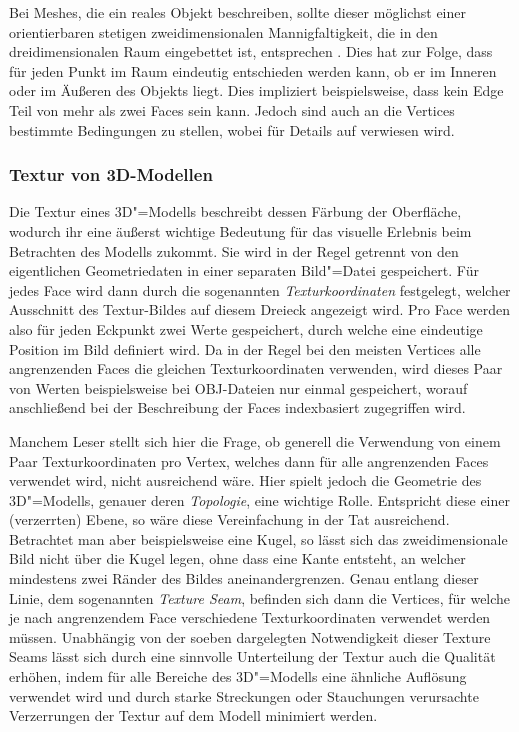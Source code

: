 Bei Meshes, die ein reales Objekt beschreiben, sollte dieser möglichst einer orientierbaren stetigen zweidimensionalen Mannigfaltigkeit, die in den dreidimensionalen Raum eingebettet ist, entsprechen \cite[S.~3]{botsch2010}. Dies hat zur Folge, dass für jeden Punkt im Raum eindeutig entschieden werden kann, ob er im Inneren oder im Äußeren des Objekts liegt. Dies impliziert beispielsweise, dass kein Edge Teil von mehr als zwei Faces sein kann. Jedoch sind auch an die Vertices bestimmte Bedingungen zu stellen, wobei für Details auf \cite[S.~11f]{botsch2010} verwiesen wird.

\subsubsection{Textur von 3D-Modellen}

Die Textur eines 3D"=Modells beschreibt dessen Färbung der Oberfläche, wodurch ihr eine äußerst wichtige Bedeutung für das visuelle Erlebnis beim Betrachten des Modells zukommt. Sie wird in der Regel getrennt von den eigentlichen Geometriedaten in einer separaten Bild"=Datei gespeichert. Für jedes Face wird dann durch die sogenannten \emph{Texturkoordinaten} festgelegt, welcher Ausschnitt des Textur-Bildes auf diesem Dreieck angezeigt wird. Pro Face werden also für jeden Eckpunkt zwei Werte gespeichert, durch welche eine eindeutige Position im Bild definiert wird. Da in der Regel bei den meisten Vertices alle angrenzenden Faces die gleichen Texturkoordinaten verwenden, wird dieses Paar von Werten beispielsweise bei OBJ-Dateien nur einmal gespeichert, worauf anschließend bei der Beschreibung der Faces indexbasiert zugegriffen wird.

Manchem Leser stellt sich hier die Frage, ob generell die Verwendung von einem Paar Texturkoordinaten pro Vertex, welches dann für alle angrenzenden Faces verwendet wird, nicht ausreichend wäre. Hier spielt jedoch die Geometrie des 3D"=Modells, genauer deren \emph{Topologie}, eine wichtige Rolle. Entspricht diese einer (verzerrten) Ebene, so wäre diese Vereinfachung in der Tat ausreichend. Betrachtet man aber beispielsweise eine Kugel, so lässt sich das zweidimensionale Bild nicht über die Kugel legen, ohne dass eine Kante entsteht, an welcher mindestens zwei Ränder des Bildes aneinandergrenzen. Genau entlang dieser Linie, dem sogenannten \emph{Texture Seam}, befinden sich dann die Vertices, für welche je nach angrenzendem Face verschiedene Texturkoordinaten verwendet werden müssen. Unabhängig von der soeben dargelegten Notwendigkeit dieser Texture Seams lässt sich durch eine sinnvolle Unterteilung der Textur auch die Qualität erhöhen, indem für alle Bereiche des 3D"=Modells eine ähnliche Auflösung verwendet wird und durch starke Streckungen oder Stauchungen verursachte Verzerrungen der Textur auf dem Modell minimiert werden.

